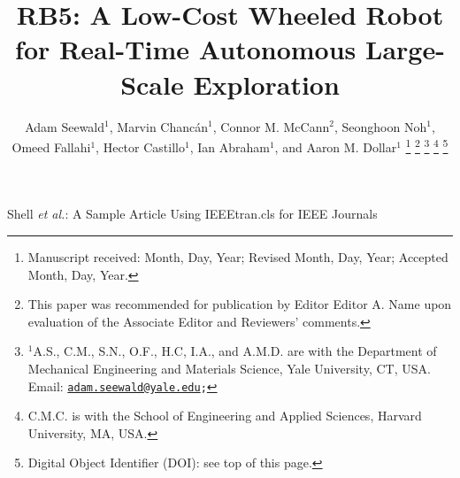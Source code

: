 \documentclass[lettersize,journal]{IEEEtran}
\begin{document}

\title{RB5: A Low-Cost Wheeled Robot for Real-Time Autonomous Large-Scale Exploration}%

\author{Adam Seewald${}^\text{1}$, Marvin Chanc{\'a}n${}^\text{1}$, Connor M. McCann${}^\text{2}$, Seonghoon Noh${}^\text{1}$, Omeed Fallahi${}^\text{1}$, Hector Castillo${}^\text{1}$, Ian Abraham${}^\text{1}$, and Aaron M. Dollar${}^\text{1}$%
  \thanks{Manuscript received: Month, Day, Year; Revised Month, Day, Year; Accepted Month, Day, Year.}%
  \thanks{This paper was recommended for publication by Editor Editor A. Name upon evaluation of the Associate Editor and Reviewers' comments.} %
  \thanks{${}^\text{1}$A.\hspace*{.4ex}S., C.\hspace*{.4ex}M., S.\hspace*{.4ex}N., O.\hspace*{.4ex}F., H.\hspace*{.4ex}C, I.\hspace*{.4ex}A., and A.\hspace*{.4ex}M.\hspace*{.4ex}D. are with the Department of Mechanical Engineering and Materials Science, Yale University, CT, USA. Email: {\tt\footnotesize \href{mailto:adam.seewald@yale.edu}{adam.seewald@yale.edu};}}
  \thanks{C.\hspace*{.4ex}M.\hspace*{.4ex}C. is with the School of Engineering and Applied Sciences, Harvard University, MA, USA.}
  \thanks{Digital Object Identifier (DOI): see top of this page.}
}

%
{Shell \MakeLowercase{\textit{et al.}}: A Sample Article Using IEEEtran.cls for IEEE Journals}


\maketitle

\begin{abstract} 

\end{abstract}
\end{document}
